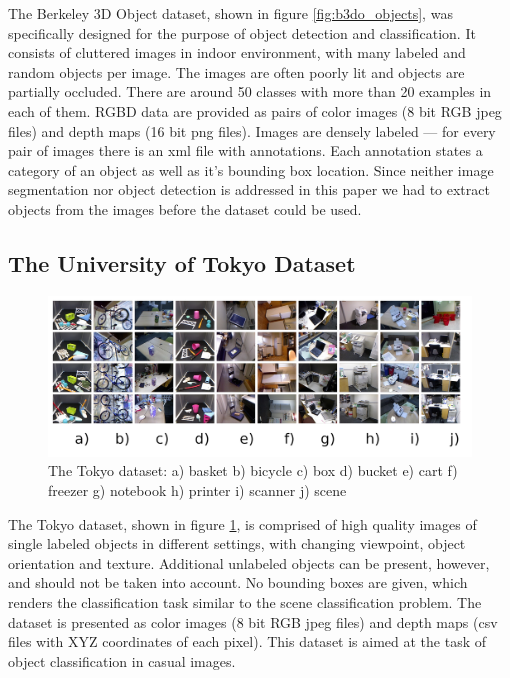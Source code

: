 \documentclass[12pt]{article}
\begin{document}
    The Berkeley 3D Object dataset, shown in figure \ref{fig:b3do_objects}, was 
specifically designed for the purpose of object detection and classification. 
It consists of cluttered images in indoor environment, with many labeled and 
random objects per image. The images are often poorly lit and objects are 
partially occluded. There are around 50 classes with more than 20 examples in 
each of them. RGBD data are provided as pairs of color images (8 bit RGB jpeg 
files) and depth maps (16 bit png files). Images are densely labeled --- for 
every pair of images there is an xml file with annotations. Each annotation 
states a category of an object as well as it's bounding box location. Since 
neither image segmentation nor object detection is addressed in this paper we 
had to extract objects from the images before the dataset could be used.

  \subsection{The University of Tokyo Dataset}	
    \begin{figure}[!ht]
    \centering
    \includegraphics[width=1\textwidth]{figs/tokyo_horizontal}
    \caption{The Tokyo dataset: a) basket b) bicycle c) box d) bucket e) cart 
f) freezer g) notebook h) printer i) scanner j) scene}
    \label{fig:tokyo}
    \end{figure}

    The Tokyo dataset, shown in figure \ref{fig:tokyo}, is comprised of high 
quality images of single labeled objects in different settings, with changing 
viewpoint, object orientation and texture. Additional unlabeled objects can be 
present, however, and should not be taken into account. No bounding boxes are 
given, which renders the classification task similar to the scene 
classification problem. The dataset is presented as color images (8 bit RGB 
jpeg files) and depth maps (csv files with XYZ coordinates of each pixel). This 
dataset is aimed at the task of object classification in casual images.
\end{document}
